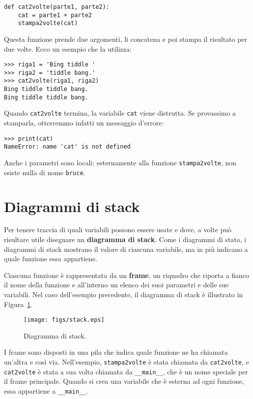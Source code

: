 \documentclass[10pt]{book}
\begin{document}
\begin{verbatim}
def cat2volte(parte1, parte2):
    cat = parte1 + parte2
    stampa2volte(cat)
\end{verbatim}
%
Questa funzione prende due argomenti, li concatena e poi stampa il risultato per due volte. Ecco un esempio che la utilizza:

\begin{verbatim}
>>> riga1 = 'Bing tiddle '
>>> riga2 = 'tiddle bang.'
>>> cat2volte(riga1, riga2)
Bing tiddle tiddle bang.
Bing tiddle tiddle bang.
\end{verbatim}
%
Quando \verb"cat2volte" termina, la variabile {\tt cat} viene distrutta. Se provassimo a stamparla, otterremmo infatti un messaggio d'errore:

\begin{verbatim}
>>> print(cat)
NameError: name 'cat' is not defined
\end{verbatim}
%
Anche i parametri sono locali: esternamente alla funzione \verb"stampa2volte", non esiste nulla di nome {\tt bruce}.


\section{Diagrammi di stack}
\label{stackdiagram}

Per tenere traccia di quali variabili possono essere usate e dove, a volte può risultare utile disegnare un {\bf diagramma di stack}. Come i diagrammi di stato, i diagrammi di stack mostrano il valore di ciascuna variabile, ma in più indicano a quale funzione essa appartiene.

Ciascuna funzione è rappresentata da un {\bf frame}, un riquadro che riporta a fianco il nome della funzione e all'interno un elenco dei suoi parametri e delle sue variabili. Nel caso dell'esempio precedente, il diagramma di stack è illustrato in Figura~\ref{fig.stack}.

\begin{figure}
\centerline
{\texttt{[image: figs/stack.eps]}}
\caption{Diagramma di stack.}
\label{fig.stack}
\end{figure}


I frame sono disposti in una pila che indica quale funzione ne ha chiamata un'altra e così via. Nell'esempio, \verb"stampa2volte" è stata chiamata da \verb"cat2volte", e \verb"cat2volte" è stata a sua volta chiamata da 
\verb"__main__", che è un nome speciale per il frame principale. Quando si crea una variabile che è esterna ad ogni funzione, essa appartiene a 
\verb"__main__".
\end{document}
